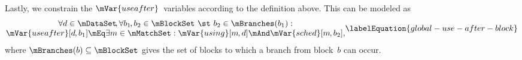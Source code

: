 Lastly, we constrain the $\mVar{useafter}$~\glspl{variable} according to the
definition above.
%
This can be modeled as
%
\begin{equation}
  \begin{array}{@{}c@{}}
    \forall d \in \mDataSet \!,
    \forall b_1 \hspace{-1pt}, b_2 \in \mBlockSet
    \text{ \st }
    b_2 \in \mBranches(b_1) : \\
    \mVar{useafter}[d \hspace{-.8pt}, b_1]
    \mEq
    \exists m \in \mMatchSet :
    \mVar{using}[m \hspace{-.8pt}, d]
    \mAnd
    \mVar{sched}[m \hspace{-.8pt}, b_2],
  \end{array}
  \labelEquation{global-use-after-block}
\end{equation}
%
where \mbox{$\mBranches(b) \subseteq \mBlockSet$} gives the set of \glspl{block}
to which a branch from \gls{block}~$b$ can occur.
